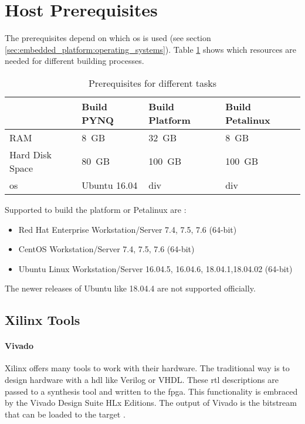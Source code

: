 \section{Host Prerequisites}
\label{sec:embedded_platform:host_prerequisites}

The prerequisites depend on which \acrshort{os} is used (see section \ref{sec:embedded_platform:operating_systems}).
Table \ref{tab:prerequisits_hardware} shows which resources are needed for different building processes. 

\begin{table}[hb]
  \caption{Prerequisites for different tasks}
  \label{tab:prerequisits_hardware}
  \centering
  \begin{tabular}{llll} %
    \toprule
    \textbf{} & \textbf{Build PYNQ} \cite{avnet_pynq_github} & \textbf{Build Platform} \cite{vitis_user_guide} & \textbf{Build Petalinux} \cite{petalinux_user_guide} \\ %
    \midrule
    RAM & \SI{8}{GB} & \SI{32}{GB} & \SI{8}{GB} \\ %
    Hard Disk Space & \SI{80}{GB} & \SI{100}{GB} & \SI{100}{GB} \\ %
    \acrlong{os} & Ubuntu 16.04 & div & div \\ %
    \bottomrule
  \end{tabular}
\end{table}

Supported  to build the platform or Petalinux are \cite{vitis_user_guide} \cite{petalinux_user_guide}:
\begin{itemize}
  \item Red Hat Enterprise Workstation/Server 7.4, 7.5, 7.6 (64-bit)
  \item CentOS Workstation/Server 7.4, 7.5, 7.6 (64-bit)
  \item Ubuntu Linux Workstation/Server 16.04.5, 16.04.6, 18.04.1,18.04.02 (64-bit)
\end{itemize}
The newer releases of Ubuntu like 18.04.4 are not supported officially.

\subsection{Xilinx Tools}
\paragraph{Vivado}
\label{subsec:embedded_platform:host_prerequisites:xilinx_tools}
Xilinx offers many tools to work with their hardware.
The traditional way is to design hardware with a \acrfull{hdl} like Verilog or VHDL.
These \acrfull{rtl} descriptions are passed to a synthesis tool and written to the \acrshort{fpga}.
This functionality is embraced by the Vivado Design Suite HLx Editions.
The output of Vivado is the bitstream that can be loaded to the target \cite{vivado_user_guide}.

